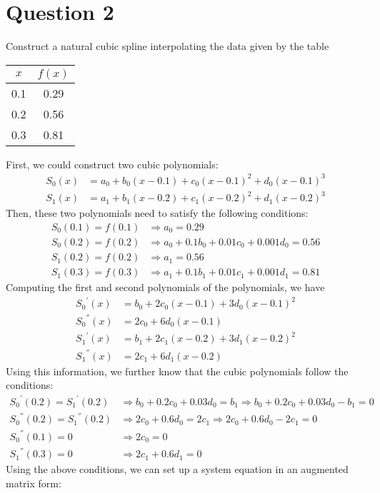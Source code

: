 \section{Question 2}

\begin{question}
    Construct a natural cubic spline interpolating the data given by the table \begin{tabular}{c|c} $x$ & $f(x)$ \\ \hline 0.1 & 0.29 \\ 0.2 & 0.56 \\ 0.3 & 0.81 \end{tabular}
\end{question}

\begin{answer}
    First, we could construct two cubic polynomials:
    \begin{align}
        S_0(x) &= a_0 + b_0(x-0.1) + c_0(x-0.1)^2 + d_0(x-0.1)^3\\
        S_1(x) &= a_1 + b_1(x-0.2) + c_1(x-0.2)^2 + d_1(x-0.2)^3
    \end{align}
    Then, these two polynomials need to satisfy the following conditions:
    \begin{align}
        S_0(0.1) = f(0.1) &\Rightarrow a_0 = 0.29\\
        S_0(0.2) = f(0.2) &\Rightarrow a_0 + 0.1b_0 + 0.01c_0 + 0.001d_0 = 0.56\\
        S_1(0.2) = f(0.2) &\Rightarrow a_1 = 0.56\\
        S_1(0.3) = f(0.3) &\Rightarrow a_1 + 0.1b_1 + 0.01c_1 + 0.001d_1 = 0.81
    \end{align}
    Computing the first and second polynomials of the polynomials, we have
    \begin{align}
        {S_0}^{'}(x) &= b_0 + 2c_0(x-0.1) + 3d_0(x-0.1)^2\\
        {S_0}^{''}(x) &= 2c_0 + 6d_0(x-0.1)\\
        {S_1}^{'}(x) &= b_1 + 2c_1(x-0.2) + 3d_1(x-0.2)^2\\
        {S_1}^{''}(x) &= 2c_1 + 6d_1(x-0.2)
    \end{align}
    Using this information, we further know that the cubic polynomials follow the conditions:
    \begin{align}
        {S_0}^{'}(0.2) = {S_1}^{'}(0.2) &\Rightarrow b_0 + 0.2c_0 + 0.03d_0 = b_1 \Rightarrow b_0 + 0.2c_0 + 0.03d_0 - b_1 = 0\\
        {S_0}^{''}(0.2) = {S_1}^{''}(0.2) &\Rightarrow 2c_0 + 0.6d_0 = 2c_1 \Rightarrow 2c_0 + 0.6d_0 - 2c_1 = 0\\
        {S_0}^{''}(0.1) = 0 &\Rightarrow 2c_0 = 0\\
        {S_1}^{''}(0.3) = 0 &\Rightarrow 2c_1 + 0.6d_1 = 0
    \end{align}
    Using the above conditions, we can set up a system equation in an augmented matrix form:
    

\end{answer}
